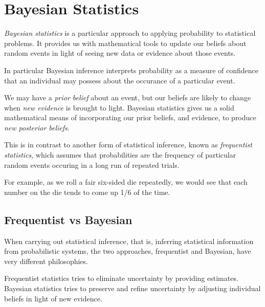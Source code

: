 \chapter{Bayesian Statistics}
\label{cap:bayes}

\emph{Bayesian statistics} is a particular approach to applying probability to statistical problems. It provides us with mathematical tools to update our beliefs about random events in light of seeing new data or evidence about those events.

In particular Bayesian inference interprets probability as a measure of confidence that an individual may possess about the occurance of a particular event.

We may have a \emph{prior belief} about an event, but our beliefs are likely to change when \emph{new evidence} is brought to light. Bayesian statistics gives us a solid mathematical means of incorporating our prior beliefs, and evidence, to produce \emph{new posterior beliefs}.

This is in contrast to another form of statistical inference, known as \emph{frequentist statistics}, which assumes that probabilities are the frequency of particular random events occuring in a long run of repeated trials.

For example, as we roll a fair six-sided die repeatedly, we would see that each number on the die tends to come up 1/6 of the time.

\section{Frequentist vs Bayesian}
When carrying out statistical inference, that is, inferring statistical information from probabilistic systems, the two approaches, frequentist and Bayesian, have very different philosophies.

Frequentist statistics tries to eliminate uncertainty by providing estimates. Bayesian statistics tries to preserve and refine uncertainty by adjusting individual beliefs in light of new evidence.

